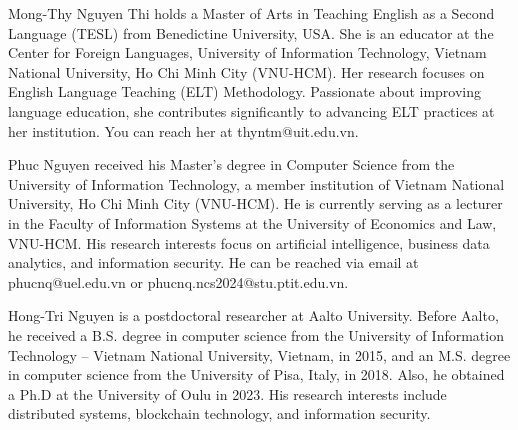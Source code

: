 \documentclass{ieeeaccess}
\begin{document}
\begin{IEEEbiography}{Mong-Thy Nguyen Thi} holds a Master of Arts in Teaching English as a Second Language (TESL) from Benedictine University, USA. She is an educator at the Center for Foreign Languages, University of Information Technology, Vietnam National University, Ho Chi Minh City (VNU-HCM). Her research focuses on English Language Teaching (ELT) Methodology. Passionate about improving language education, she contributes significantly to advancing ELT practices at her institution. You can reach her at thyntm@uit.edu.vn.
\end{IEEEbiography}

\begin{IEEEbiography}{Phuc Nguyen} received his Master’s degree in Computer Science from the University of Information Technology, a member institution of Vietnam National University, Ho Chi Minh City (VNU-HCM). He is currently serving as a lecturer in the Faculty of Information Systems at the University of Economics and Law, VNU-HCM. His research interests focus on artificial intelligence, business data analytics, and information security. He can be reached via email at phucnq@uel.edu.vn or phucnq.ncs2024@stu.ptit.edu.vn.
\end{IEEEbiography}

\begin{IEEEbiography}{Hong-Tri Nguyen} is a postdoctoral researcher at Aalto University. Before Aalto, he received a B.S. degree in computer science from the University of Information Technology -- Vietnam National University, Vietnam, in 2015, and an M.S. degree in computer science from the University of Pisa, Italy, in 2018. Also, he obtained a Ph.D at the University of Oulu in 2023. His research interests include distributed systems, blockchain technology, and information security.
\end{IEEEbiography}
\end{document}

